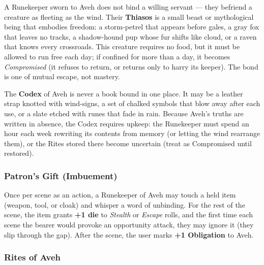 A Runekeeper sworn to Aveh does not bind a willing servant --- they befriend a creature as fleeting as the wind. Their \textbf{Thiasos} is a small beast or mythological being that embodies freedom: a storm-petrel that appears before gales, a gray fox that leaves no tracks, a shadow-hound pup whose fur shifts like cloud, or a raven that knows every crossroads. This creature requires no food, but it must be allowed to run free each day; if confined for more than a day, it becomes \textit{Compromised} (it refuses to return, or returns only to harry its keeper). The bond is one of mutual escape, not mastery.

The \textbf{Codex} of Aveh is never a book bound in one place. It may be a leather strap knotted with wind-signs, a set of chalked symbols that blow away after each use, or a slate etched with runes that fade in rain. Because Aveh's truths are written in absence, the Codex requires upkeep: the Runekeeper must spend an hour each week rewriting its contents from memory (or letting the wind rearrange them), or the Rites stored there become uncertain (treat as Compromised until restored).

\subsubsection*{Patron's Gift (Imbuement)}

Once per scene as an action, a Runekeeper of Aveh may touch a held item (weapon, tool, or cloak) and whisper a word of unbinding. For the rest of the scene, the item grants \textbf{+1 die} to \textit{Stealth} or \textit{Escape} rolls, and the first time each scene the bearer would provoke an opportunity attack, they may ignore it (they slip through the gap). After the scene, the user marks \textbf{+1 Obligation} to Aveh.

\subsubsection*{Rites of Aveh}

